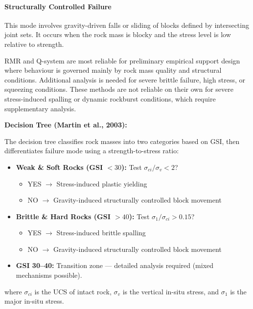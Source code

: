 \paragraph{Structurally Controlled Failure}
This mode involves gravity-driven falls or sliding of blocks defined by intersecting joint sets. It occurs when the rock mass is blocky and the stress level is low relative to strength.

\begin{notebox}
RMR and Q-system are most reliable for preliminary empirical support design where behaviour is governed mainly by rock mass quality and structural conditions. Additional analysis is needed for severe brittle failure, high stress, or squeezing conditions. These methods are not reliable on their own for severe stress-induced spalling or dynamic rockburst conditions, which require supplementary analysis.
\end{notebox}

\textbf{Decision Tree (Martin et al., 2003):}

The decision tree classifies rock masses into two categories based on GSI, then differentiates failure mode using a strength-to-stress ratio:
\begin{itemize}
 \item \textbf{Weak \& Soft Rocks (GSI $< 30$):} Test $\sigma_{ci}/\sigma_v < 2$?
 \begin{itemize}
 \item YES $\rightarrow$ Stress-induced plastic yielding
 \item NO $\rightarrow$ Gravity-induced structurally controlled block movement
 \end{itemize}
 \item \textbf{Brittle \& Hard Rocks (GSI $> 40$):} Test $\sigma_1/\sigma_{ci} > 0.15$?
 \begin{itemize}
 \item YES $\rightarrow$ Stress-induced brittle spalling
 \item NO $\rightarrow$ Gravity-induced structurally controlled block movement
 \end{itemize}
 \item \textbf{GSI 30--40:} Transition zone --- detailed analysis required (mixed mechanisms possible).
\end{itemize}

where $\sigma_{ci}$ is the UCS of intact rock, $\sigma_v$ is the vertical in-situ stress, and $\sigma_1$ is the major in-situ stress.

